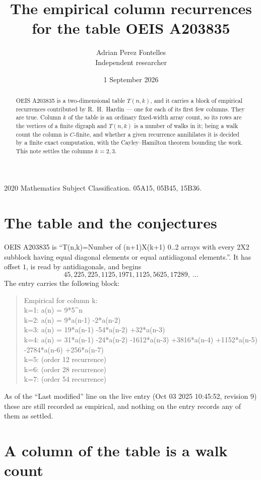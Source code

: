 \documentclass[11pt,a4paper]{article}
\title{The empirical column recurrences for the table OEIS A203835}
\author{Adrian Perez Fontelles\\ \small Independent researcher}
\date{1 September 2026}
\theoremstyle{plain}
\theoremstyle{definition}
\begin{document}
\maketitle

\begin{abstract}
OEIS A203835 is a two-dimensional table $T(n,k)$, and it carries a block of empirical
recurrences contributed by R.~H.~Hardin --- one for each of its first few columns. They are
true. Column $k$ of the table is an ordinary fixed-width array count, so its rows are the
vertices of a finite digraph and $T(n,k)$ is a number of walks in it; being a walk count the
column is $C$-finite, and whether a given recurrence annihilates it is decided by a finite
exact computation, with the Cayley--Hamilton theorem bounding the work. This note settles the
columns $k=2, 3$.
\end{abstract}

\noindent\small 2020 Mathematics Subject Classification. 05A15, 05B45, 15B36.\normalsize

\section{The table and the conjectures}

OEIS A203835 is ``T(n,k)=Number of (n+1)X(k+1) 0..2 arrays with every 2X2 subblock having equal diagonal elements or equal antidiagonal elements.''. It has offset $1$, is
read by antidiagonals, and begins
\[
45, 225, 225, 1125, 1971, 1125, 5625, 17289,\ \dots
\]
The entry carries the following block:
\begin{quote}\small
Empirical for column k:\\
k=1: a(n) = 9*5\^{}n\\
k=2: a(n) = 9*a(n-1) -2*a(n-2)\\
k=3: a(n) = 19*a(n-1) -54*a(n-2) +32*a(n-3)\\
k=4: a(n) = 31*a(n-1) -24*a(n-2) -1612*a(n-3) +3816*a(n-4) +1152*a(n-5) -2784*a(n-6) +256*a(n-7)\\
k=5: (order 12 recurrence)\\
k=6: (order 28 recurrence)\\
k=7: (order 54 recurrence)\\
\end{quote}
As of the ``Last modified'' line on the live entry (Oct 03 2025 10:45:52, revision 9) these are still
recorded as empirical, and nothing on the entry records any of them as settled.

\section{A column of the table is a walk count}
\end{document}
